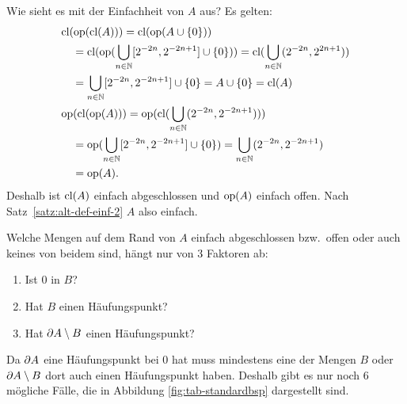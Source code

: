     \noindent
    Wie
    sieht es mit der Einfachheit von $A$ aus?
    Es gelten:
    \begin{align*}
        &\text{cl}(\text{op}(\text{cl}(A))) 
        = \text{cl}(\text{op}(A \cup \{0\})) 
        \\
        &\quad = \text{cl}(\text{op}(\bigcup_{n \in \mathbb{N}} [2^{-2n}, 2^{-2n+1}] \cup \{0\})) 
        = \text{cl}(\bigcup_{n \in \mathbb{N}} (2^{-2n}, 2^{2n+1})) 
        \\
        &\quad = \bigcup_{n \in \mathbb{N}} [2^{-2n}, 2^{-2n+1}] \cup \{0\} 
        = A \cup \{0\} 
        = \text{cl}(A)
        \\
        &\text{op}(\text{cl}(\text{op}(A))) 
        = \text{op}(\text{cl}(\bigcup_{n \in \mathbb{N}} (2^{-2n}, 2^{-2n+1})))
        \\
        &\quad = \text{op}(\bigcup_{n \in \mathbb{N}} [2^{-2n}, 2^{-2n+1}] \cup \{0\})
        = \bigcup_{n \in \mathbb{N}} (2^{-2n}, 2^{-2n+1})
        \\
        &\quad = \text{op}(A).
    \end{align*}
    Deshalb ist $\text{cl}(A)$ einfach abgeschlossen und $\text{op}(A)$ einfach offen. 
    Nach Satz~\ref{satz:alt-def-einf-2} $A$ also einfach.\\ 
    \vspace{-5pt}
    
    \noindent
    Welche
    Mengen auf dem Rand von $A$ einfach abgeschlossen bzw.\ offen oder auch keines von beidem sind, hängt nur von 3 Faktoren ab:
    \begin{enumerate}
        \item Ist $0$ in $B$?
        \item Hat $B$ einen Häufungspunkt?
        \item Hat $\partial A \setminus B$ einen Häufungspunkt?
    \end{enumerate}
    \noindent
    Da $\partial A$ eine Häufungspunkt bei $0$ hat muss mindestens eine der Mengen $B$ oder $\partial A \setminus B$ dort auch einen Häufungspunkt haben.
    Deshalb gibt es nur noch 6 mögliche Fälle, die in Abbildung \ref{fig:tab-standardbsp} dargestellt sind.
    
